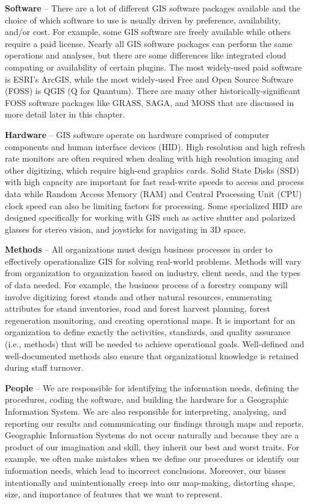 \documentclass[
]{book}
\begin{document}
\textbf{Software} -- There are a lot of different GIS software packages available and the choice of which software to use is usually driven by preference, availability, and/or cost. For example, some GIS software are freely available while others require a paid license. Nearly all GIS software packages can perform the same operations and analyses, but there are some differences like integrated cloud computing or availability of certain plugins. The most widely-used paid software is ESRI's ArcGIS, while the most widely-used Free and Open Source Software (FOSS) is QGIS (Q for Quantum). There are many other historically-significant FOSS software packages like GRASS, SAGA, and MOSS that are discussed in more detail later in this chapter.

\textbf{Hardware} -- GIS software operate on hardware comprised of computer components and human interface devices (HID). High resolution and high refresh rate monitors are often required when dealing with high resolution imaging and other digitizing, which require high-end graphics cards. Solid State Disks (SSD) with high capacity are important for fast read-write speeds to access and process data while Random Access Memory (RAM) and Central Processing Unit (CPU) clock speed can also be limiting factors for processing. Some specialized HID are designed specifically for working with GIS such as active shutter and polarized glasses for stereo vision, and joysticks for navigating in 3D space.

\textbf{Methods} -- All organizations must design business processes in order to effectively operationalize GIS for solving real-world problems. Methods will vary from organization to organization based on industry, client needs, and the types of data needed. For example, the business process of a forestry company will involve digitizing forest stands and other natural resources, enumerating attributes for stand inventories, road and forest harvest planning, forest regeneration monitoring, and creating operational maps. It is important for an organization to define exactly the activities, standards, and quality assurance (i.e., methods) that will be needed to achieve operational goals. Well-defined and well-documented methods also ensure that organizational knowledge is retained during staff turnover.

\textbf{People} -- We are responsible for identifying the information needs, defining the procedures, coding the software, and building the hardware for a Geographic Information System. We are also responsible for interpreting, analysing, and reporting our results and communicating our findings through maps and reports. Geographic Information Systems do not occur naturally and because they are a product of our imagination and skill, they inherit our best and worst traits. For example, we often make mistakes when we define our procedures or identify our information needs, which lead to incorrect conclusions. Moreover, our biases intentionally and unintentionally creep into our map-making, distorting shape, size, and importance of features that we want to represent.
\end{document}
